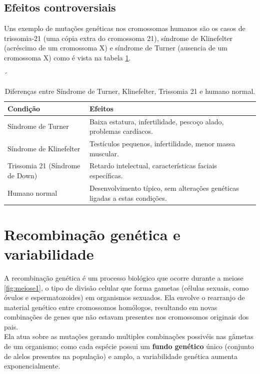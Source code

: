 \documentclass{report}
\begin{document}
\subsection{Efeitos controversiais}

Uns exemplo de mutações genéticas nos cromossomas humanos são os casos de trissomia-21 (uma cópia extra do cromossoma 21), síndrome de Klinefelter (acréscimo de um cromossoma X) e síndrome de Turner (ausencia de um cromossoma X) como é vista na tabela \ref{tab:sindromes}. 

\begin{table}[h!]
´\centering
\begin{tabular}{|p{4cm}|p{4cm}|p{6cm}|}
\hline
\textbf{Condição}    & \textbf{Efeitos} \\ \hline
Síndrome de Turner   & Baixa estatura, infertilidade, pescoço alado, problemas cardíacos. \\ \hline
Síndrome de Klinefelter & Testículos pequenos, infertilidade, menor massa muscular. \\ \hline
Trissomia 21 (Síndrome de Down) & Retardo intelectual, características faciais específicas. \\ \hline
Humano normal ~ & Desenvolvimento típico, sem alterações genéticas ligadas a estas condições. \\ \hline
\end{tabular}
\caption{Diferenças entre Síndrome de Turner, Klinefelter, Trissomia 21 e humano normal.}
\label{tab:sindromes}
\end{table}

\section{Recombinação genética e variabilidade}

A recombinação genética é um processo biológico que ocorre durante a meiose \ref{fig:meiose1}, o tipo de divisão celular que forma gametas (células sexuais, como óvulos e espermatozoides) em organismos sexuados. Ela envolve o rearranjo de material genético entre cromossomos homólogos, resultando em novas combinações de genes que não estavam presentes nos cromossomos originais dos pais. \\ 

Ela atua sobre as mutações gerando multiples combinações possivéis nas gâmetas de um organismo; como cada espécie possui um \textbf{fundo genético} único (conjunto de alelos presentes na população) e amplo, a variabilidade genética aumenta exponencialmente. 
\end{document}
